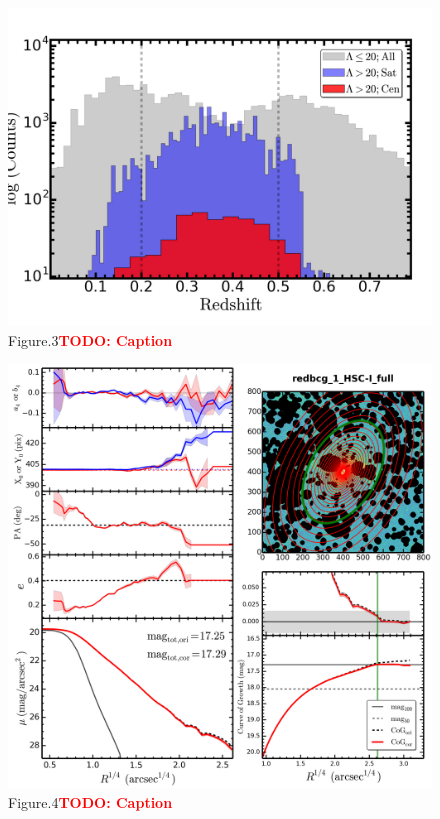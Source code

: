 \documentclass[preprint]{aastex}
\newcommand{\todo}[1]{\textcolor{red}{\textbf{TODO: #1}}}
\begin{document}
\begin{CJK*}{UTF8}{gbsn}
\clearpage
{}
\begin{figure}
    \centering 
    \includegraphics[width=13.5cm]{fig/massive_s15b_zuse_hist1.png}
    \caption{Figure.3\todo{Caption}}
    \label{figure:3}
\end{figure}

\clearpage
{}
\begin{figure}
    \centering 
    \includegraphics[width=15.5cm]{fig/redbcg_1_HSC-I_full_imgsub_ellip_default_sum.png}
    \caption{Figure.4\todo{Caption}}
    \label{figure:4}
\end{figure}


\end{CJK*}
\end{document}
